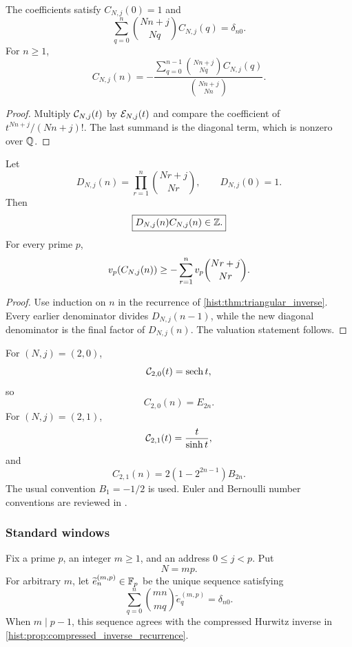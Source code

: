 \begin{histtheorem}\label{hist:thm:triangular_inverse}
The coefficients satisfy \(C_{N,j}(0)=1\) and
\[
\boxed{
\sum_{q=0}^{n}
\binom{Nn+j}{Nq}
C_{N,j}(q)
=
\delta_{n0}.
}
\]
For \(n\geq1\),
\[
\boxed{
C_{N,j}(n)
=
-
\frac{
\sum_{q=0}^{n-1}
\binom{Nn+j}{Nq}C_{N,j}(q)
}{
\binom{Nn+j}{Nn}
}.
}
\]
\end{histtheorem}

\begin{proof}
Multiply \(\mathcal C_{N,j}(t)\) by \(\mathcal E_{N,j}(t)\) and compare the coefficient of \(t^{Nn+j}/(Nn+j)!\). The last summand is the diagonal term, which is nonzero over \(\mathbb Q\).
\end{proof}

\begin{histproposition}\label{hist:prop:denominator_bound}
Let
\[
D_{N,j}(n)
=
\prod_{r=1}^{n}
\binom{Nr+j}{Nr},
\qquad
D_{N,j}(0)=1.
\]
Then
\[
\boxed{
D_{N,j}(n)C_{N,j}(n)
\in
\mathbb Z.
}
\]
For every prime \(p\),
\[
v_p(C_{N,j}(n))
\geq
-
\sum_{r=1}^{n}
v_p\binom{Nr+j}{Nr}.
\]
\end{histproposition}

\begin{proof}
Use induction on \(n\) in the recurrence of \cref{hist:thm:triangular_inverse}. Every earlier denominator divides \(D_{N,j}(n-1)\), while the new diagonal denominator is the final factor of \(D_{N,j}(n)\). The valuation statement follows.
\end{proof}

\begin{histexample}\label{hist:ex:euler_bernoulli_boundaries}
For \((N,j)=(2,0)\),
\[
\mathcal C_{2,0}(t)=\operatorname{sech}t,
\]
so
\[
C_{2,0}(n)=E_{2n}.
\]
For \((N,j)=(2,1)\),
\[
\mathcal C_{2,1}(t)=\frac{t}{\sinh t},
\]
and
\[
C_{2,1}(n)
=
2\left(1-2^{2n-1}\right)B_{2n}.
\]
The usual convention \(B_1=-1/2\) is used. Euler and Bernoulli number conventions are reviewed in \cite{Comtet1974,Stanley2012}.
\end{histexample}

\subsubsection{Standard windows}

Fix a prime \(p\), an integer \(m\geq1\), and an address \(0\leq j<p\). Put
\[
N=mp.
\]
For arbitrary \(m\), let \(\widetilde e_n^{(m,p)}\in\mathbb F_p\) be the unique sequence satisfying
\[
\boxed{
\sum_{q=0}^{n}
\binom{mn}{mq}
\widetilde e_q^{(m,p)}
=
\delta_{n0}.
}
\]
When \(m\mid p-1\), this sequence agrees with the compressed Hurwitz inverse in \cref{hist:prop:compressed_inverse_recurrence}.

